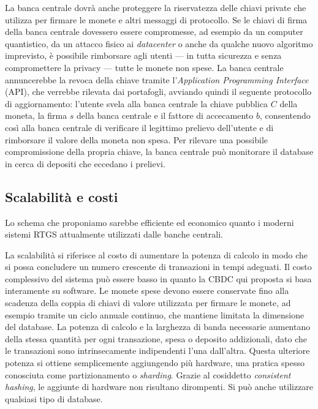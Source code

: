 \documentclass[a4paper]{article}
\begin{document}
La banca centrale dovrà anche proteggere la riservatezza delle chiavi
private che utilizza per firmare le monete e altri messaggi di
protocollo. Se le chiavi di firma della banca centrale dovessero
essere compromesse, ad esempio da un computer quantistico, da un
attacco fisico ai \textit{datacenter} o anche da qualche nuovo algoritmo
imprevisto, è possibile rimborsare agli utenti --- in tutta sicurezza e
senza compromettere la privacy --- tutte le monete non spese. La banca
centrale annuncerebbe la revoca della chiave tramite l'\textit{Application
Programming Interface} (API), che verrebbe rilevata dai portafogli,
avviando quindi il seguente protocollo di aggiornamento: l'utente
svela alla banca centrale la chiave pubblica $C$ della moneta, la firma
$s$ della banca centrale e il fattore di accecamento $b$, consentendo così
alla banca centrale di verificare il legittimo prelievo dell'utente e
di rimborsare il valore della moneta non spesa. Per rilevare una
possibile compromissione della propria chiave, la banca centrale può
monitorare il database in cerca di depositi che eccedano i prelievi.

\subsection{Scalabilità e costi}\label{scalabilità-e-costi}

Lo schema che proponiamo sarebbe efficiente ed economico quanto i
moderni sistemi RTGS attualmente utilizzati dalle banche centrali.

La scalabilità si riferisce al costo di aumentare la potenza di
calcolo in modo che si possa concludere un numero crescente di
transazioni in tempi adeguati. Il costo complessivo del sistema può
essere basso in quanto la CBDC qui proposta si basa interamente su
software. Le monete spese devono essere conservate fino alla scadenza
della coppia di chiavi di valore utilizzata per firmare le monete, ad
esempio tramite un ciclo annuale continuo, che mantiene limitata la
dimensione del database. La potenza di calcolo e la larghezza di banda
necessarie aumentano della stessa quantità per ogni transazione, spesa
o deposito addizionali, dato che le transazioni sono intrinsecamente
indipendenti l'una dall'altra. Questa ulteriore potenza si ottiene
semplicemente aggiungendo più hardware, una pratica spesso conosciuta
come partizionamento o \textit{sharding}. Grazie al cosiddetto
\textit{consistent hashing}, le aggiunte di hardware non risultano
dirompenti. Si può anche utilizzare qualsiasi tipo di database.
\end{document}
